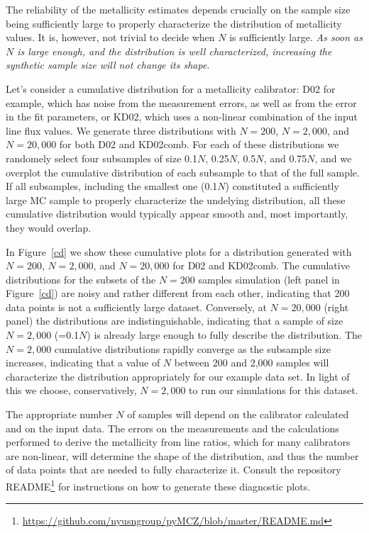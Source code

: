 \documentclass{emulateapj} \usepackage{amsmath} \usepackage{float}
\begin{document}
The reliability of the metallicity estimates depends crucially on the
sample size being sufficiently large to properly characterize the
distribution of metallicity values. It is, however, not trivial to
decide when $N$ is sufficiently large. \emph{As soon as $N$ is large enough,
and the distribution is well characterized, increasing the synthetic
sample size will not change its shape}.

Let's consider a cumulative distribution for a metallicity calibrator:
D02 for example, which has noise from the measurement errors, as well
as from the error in the fit parameters, or KD02, which uses a
non-linear combination of the input line flux values. We generate
three distributions with $N=200$, $N=2,000$, and $N=20,000$ for both
D02 and KD02comb.  For each of these distributions we randomely select
four subsamples of size 0.1$N$, 0.25$N$, 0.5$N$, and 0.75$N$, and we overplot
the cumulative distribution of each subsample to that of the full
sample. If all subsamples, including the smallest one (0.1$N$)
constituted a sufficiently large MC sample to properly characterize
the undelying distribution, all these cumulative distribution
would typically appear smooth and, most importantly, they would
overlap.

In Figure~\ref{cd} we show these cumulative plots for a distribution
generated with $N=200$, $N=2,000$, and $N=20,000$ for D02 and
KD02comb. The cumulative distributions for the subsets of the $N=200$
samples simulation (left panel in Figure~\ref{cd}) are noisy and
rather different from each other, indicating that 200 data points is
not a sufficiently large dataset. Conversely, at $N=20,000$ (right
panel) the distributions are indistinguishable, indicating that a
sample of size $N=2,000$ (=0.1$N$) is
already large enough to fully describe the distribution. The $N=2,000$
cumulative distributions rapidly converge as the subsample size
increases, indicating that a value of $N$ between 200 and 2,000
samples will characterize the distribution appropriately for our
example data set.  In light of this we choose, conservatively,
$N=2,000$ to run our simulations for this dataset.

The appropriate number $N$ of samples will depend on the calibrator
calculated and on the input data. The errors on the measurements and
the calculations performed to derive the metallicity from line ratios,
which for many calibrators are non-linear, will determine the shape of
the distribution, and thus the number of data points that are needed
to fully characterize it. Consult the repository
README\footnote{\url{https://github.com/nyusngroup/pyMCZ/blob/master/README.md}}
for instructions on how to generate these diagnostic plots.
\end{document}
